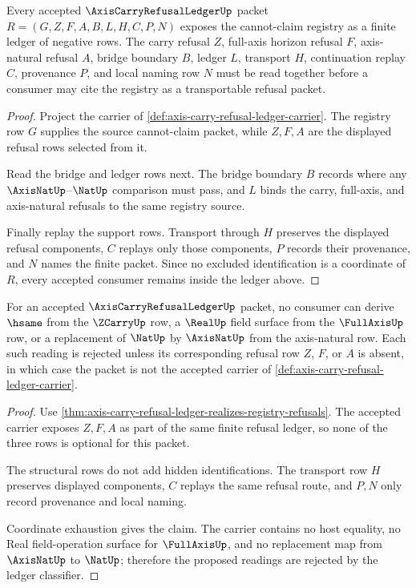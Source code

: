 \begin{theorem}
\label{thm:axis-carry-refusal-ledger-realizes-registry-refusals}
Every accepted $\AxisCarryRefusalLedgerUp$ packet $R=(G,Z,F,A,B,L,H,C,P,N)$ exposes the cannot-claim registry as a finite ledger of negative rows. The carry refusal $Z$, full-axis horizon refusal $F$, axis-natural refusal $A$, bridge boundary $B$, ledger $L$, transport $H$, continuation replay $C$, provenance $P$, and local naming row $N$ must be read together before a consumer may cite the registry as a transportable refusal packet.
\end{theorem}
\begin{proof}
Project the carrier of \autoref{def:axis-carry-refusal-ledger-carrier}. The registry row $G$ supplies the source cannot-claim packet, while $Z,F,A$ are the displayed refusal rows selected from it.

Read the bridge and ledger rows next. The bridge boundary $B$ records where any $\AxisNatUp$--$\NatUp$ comparison must pass, and $L$ binds the carry, full-axis, and axis-natural refusals to the same registry source.

Finally replay the support rows. Transport through $H$ preserves the displayed refusal components, $C$ replays only those components, $P$ records their provenance, and $N$ names the finite packet. Since no excluded identification is a coordinate of $R$, every accepted consumer remains inside the ledger above.
\end{proof}

\begin{theorem}
\label{thm:axis-carry-refusal-ledger-nonidentification}
For an accepted $\AxisCarryRefusalLedgerUp$ packet, no consumer can derive $\hsame$ from the $\ZCarryUp$ row, a $\RealUp$ field surface from the $\FullAxisUp$ row, or a replacement of $\NatUp$ by $\AxisNatUp$ from the axis-natural row. Each such reading is rejected unless its corresponding refusal row $Z$, $F$, or $A$ is absent, in which case the packet is not the accepted carrier of \autoref{def:axis-carry-refusal-ledger-carrier}.
\end{theorem}
\begin{proof}
Use \autoref{thm:axis-carry-refusal-ledger-realizes-registry-refusals}. The accepted carrier exposes $Z,F,A$ as part of the same finite refusal ledger, so none of the three rows is optional for this packet.

The structural rows do not add hidden identifications. The transport row $H$ preserves displayed components, $C$ replays the same refusal route, and $P,N$ only record provenance and local naming.

Coordinate exhaustion gives the claim. The carrier contains no host equality, no Real field-operation surface for $\FullAxisUp$, and no replacement map from $\AxisNatUp$ to $\NatUp$; therefore the proposed readings are rejected by the ledger classifier.
\end{proof}

